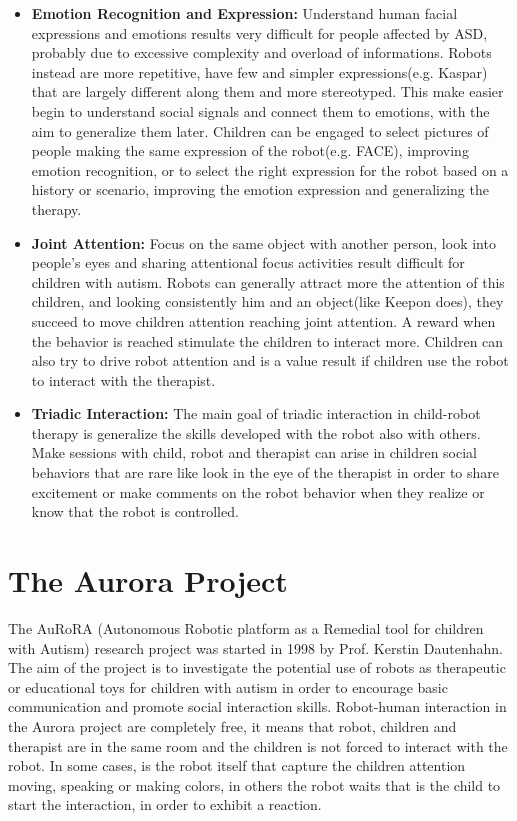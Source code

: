 \begin{itemize}
	\item \textbf{Emotion Recognition and Expression:} Understand human facial expressions and emotions results very difficult for people affected by ASD, probably due to excessive complexity and overload of informations. Robots instead are more repetitive, have few and simpler expressions(e.g. Kaspar) that are largely different along them and more stereotyped. This make easier begin to understand social signals and connect them to emotions, with the aim to generalize them later. Children can be engaged to select pictures of people making the same expression of the robot(e.g. FACE), improving emotion recognition, or to select the right expression for the robot based on a history or scenario, improving the emotion expression and generalizing the therapy.
	
	\item \textbf{Joint Attention:} Focus on the same object with another person, look into people's eyes and sharing attentional focus activities result difficult for children with autism. Robots can generally attract more the attention of this children, and looking consistently him and an object(like Keepon does), they succeed to move children attention reaching joint attention. A reward when the behavior is reached stimulate the children to interact more. Children can also try to drive robot attention and is a value result if children use the robot to interact with the therapist.  
	
	\item \textbf{Triadic Interaction:} The main goal of triadic interaction in child-robot therapy is generalize the skills developed with the robot also with others. Make sessions with child, robot and therapist can arise in children social behaviors that are rare like look in the eye of the therapist in order to share excitement or make comments on the robot behavior when they realize or know that the robot is controlled. 
\end{itemize}




\section{The Aurora Project}
The AuRoRA (Autonomous Robotic platform as a Remedial tool for children with Autism) research
project was started in 1998 by Prof. Kerstin Dautenhahn. The aim of the project is to investigate the potential use of robots as therapeutic or educational toys for children with autism in order to encourage basic communication and promote social interaction skills\cite{robins2009isolation}.
Robot-human interaction in the Aurora project are completely free, it means that robot, children and therapist are in the same room and the children is not forced to interact with the robot. In some cases, is the robot itself that capture the children attention moving, speaking or making colors, in others the robot waits that is the child to start the interaction, in order to exhibit a reaction.

